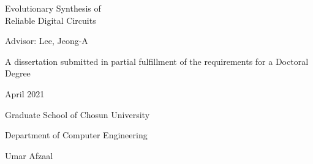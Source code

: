 \vspace*{20mm}

\begin{center}
	\huge \sffamily
	Evolutionary Synthesis of \\
	Reliable Digital Circuits
\end{center}
\vspace{6mm}
\begin{center}
	{\large \sffamily Advisor: Lee, Jeong-A}
\end{center}
\vspace{10mm}
\begin{center}
	{\large \sffamily A dissertation submitted in partial fulfillment of the
		requirements for a Doctoral Degree}
\end{center}
\vspace{3mm}
\begin{center}
	{\large \sffamily April 2021}
\end{center}
\vspace{10mm}
\begin{center}
	{\LARGE \sffamily Graduate School of Chosun University}
\end{center}
\vspace{1mm}
\begin{center}
	{\Large \sffamily Department of Computer Engineering}
\end{center}
\vspace{1mm}
\begin{center}
	{\LARGE \sffamily Umar Afzaal}
\end{center}
\cleardoublepage